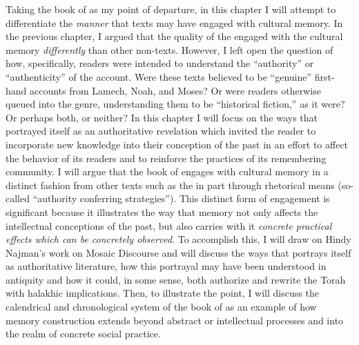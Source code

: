Taking the book of \jub as my point of departure, in this chapter I will attempt to differentiate the \emph{manner} that \rwb texts may have engaged with cultural memory. In the previous chapter, I argued that the \psgraphical quality of the \ga engaged with the cultural memory \emph{differently} than other non-\psgraphical texts. However, I left open the question of how, specifically, readers were intended to understand the ``authority'' or ``authenticity'' of the account. Were these \psgraphical texts believed to be ``genuine'' first-hand accounts from Lamech, Noah, and Moses? Or were readers otherwise queued into the genre, understanding them to be ``historical fiction,'' as it were? Or perhaps both, or neither? In this chapter I will focus on the ways that \jub portrayed itself as an authoritative revelation which invited the reader to incorporate new knowledge into their conception of the past in an effort to affect the behavior of its readers and to reinforce the practices of its remembering community. I will argue that the book of \jub engages with cultural memory in a distinct fashion from other texts such as the \ga in part through rhetorical means (so-called ``authority conferring strategies''). This distinct form of engagement is significant because it illustrates the way that memory not only affects the intellectual conceptions of the past, but also carries with it \emph{concrete practical effects which can be concretely observed}. To accomplish this, I will draw on Hindy Najman's work on Mosaic Discourse and will discuss the ways that \jub portrays itself as authoritative literature, how this portrayal may have been understood in antiquity and how it could, in some sense, both authorize and rewrite the Torah with halakhic implications. Then, to illustrate the point, I will discuss the calendrical and chronological system of the book of \jub as an example of how memory construction extends beyond abstract or intellectual processes and into the realm of concrete social practice.


